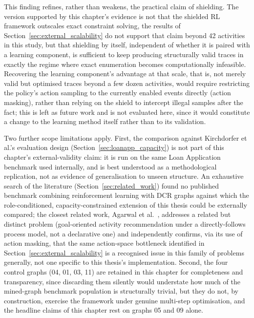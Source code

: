 This finding refines, rather than weakens, the practical claim of
shielding. The version supported by this chapter's evidence is not
that the shielded \ac{RL} framework outscales exact constraint solving,
the results of Section~\ref{sec:external_scalability} do not support
that claim beyond 42 activities in this study, but that shielding by
itself, independent of whether it is paired with a learning component,
is sufficient to keep producing structurally valid traces in exactly
the regime where exact enumeration becomes computationally infeasible.
Recovering the learning component's advantage at that scale, that is,
not merely valid but optimised traces beyond a few dozen activities,
would require restricting the policy's action sampling to the
currently enabled events directly (action masking), rather than relying
on the shield to intercept illegal samples after the fact; this is left
as future work and is not evaluated here, since it would constitute a
change to the learning method itself rather than to its validation.

Two further scope limitations apply. First, the comparison against
Kirchdorfer et al.'s evaluation design
(Section~\ref{sec:loanapp_capacity}) is not part of this chapter's
external-validity claim: it is run on the same Loan Application
benchmark used internally, and is best understood as a methodological
replication, not as evidence of generalisation to unseen structure. An
exhaustive search of the literature (Section~\ref{sec:related_work})
found no published benchmark combining reinforcement learning with
\ac{DCR} graphs against which the role-conditioned, capacity-constrained
extension of this thesis could be externally compared; the closest
related work, Agarwal et al.~\cite{Agarwal2022GoalOriented}, addresses
a related but distinct problem (goal-oriented activity recommendation
under a directly-follows process model, not a declarative one) and
independently confirms, via its use of action masking, that the same
action-space bottleneck identified in
Section~\ref{sec:external_scalability} is a recognised issue in this
family of problems generally, not one specific to this thesis's
implementation. Second, the four control graphs (04, 01, 03, 11) are
retained in this chapter for completeness and transparency, since
discarding them silently would understate how much of the mined-graph
benchmark population is structurally trivial, but they do not, by
construction, exercise the framework under genuine multi-step
optimisation, and the headline claims of this chapter rest on graphs
05 and 09 alone.
